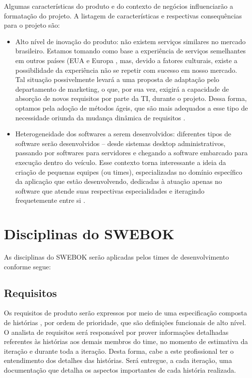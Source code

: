 \documentclass[12pt,journal,compsoc]{IEEEtran}
\begin{document}
Algumas características do produto e do contexto de negócios influenciarão a formatação do projeto. A listagem de características e respectivas consequências para o projeto são:

\begin{itemize}

\item Alto nível de inovação do produto: não existem serviços similares no mercado brasileiro. Estamos tomando como base a experiência de serviços semelhantes em outros países (EUA e Europa \cite{car2go_locations}, mas, devido a fatores culturais, existe a possibilidade da experiência não se repetir com sucesso em nosso mercado. Tal situação possivelmente levará a uma proposta de adaptação pelo departamento de marketing, o que, por sua vez, exigirá a capacidade de absorção de novos requisitos por parte da TI, durante o projeto. Dessa forma, optamos pela adoção de métodos ágeis, que são mais adequados a esse tipo de necessidade oriunda da mudança dinâmica de requisitos \cite{cao_ramesh_2008}.

\item Heterogeneidade dos softwares a serem desenvolvidos: diferentes tipos de software serão desenvolvidos -- desde sistemas desktop administrativos, passando por softwares para servidores e chegando a software embarcado para execução dentro do veículo. Esse contexto torna interessante a ideia da criação de pequenas equipes (ou times), especializadas no domínio específico da aplicação que estão desenvolvendo, dedicadas à atuação apenas no software que atende suas respectivas especialidades e iteragindo frequetemente entre si \cite{backmann_nord_ozkaya_2012}.

\end{itemize}

\section{Disciplinas do SWEBOK}

As disciplinas do SWEBOK serão aplicadas pelos times de desenvolvimento conforme segue: 

\subsection{Requisitos}

Os requisitos de produto serão expressos por meio de uma especificação composta
de histórias \cite{primo_user_2011}, por ordem de prioridade, que são definições funcionais de alto
nível. O analista de requisitos será responsável por prover informações
detalhadas referentes às histórias aos demais membros do time, no momento de
estimativa da iteração e durante toda a iteração. Desta forma, cabe a este
profissional ter o entendimento dos detalhes das histórias. Será entregue, a
cada iteração, uma documentação que detalha os aspectos importantes de cada
história realizada. 
\end{document}
